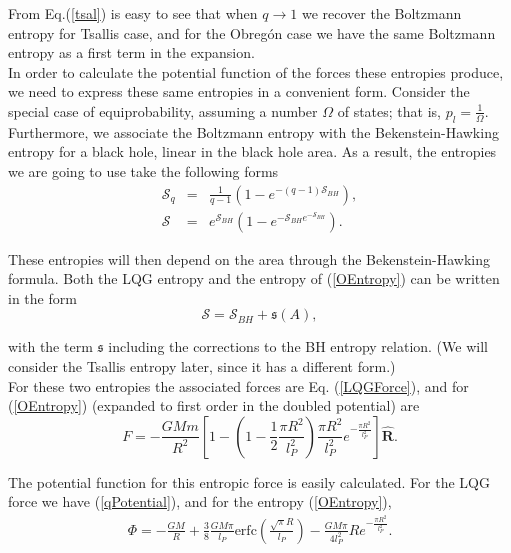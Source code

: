 \documentclass[nofootinbib,aps,prd,preprint,groupedaddress,showpacs,showkeys]{revtex4-1}
\begin{document}
\noindent From Eq.(\ref {tsal}) is easy to see that when $q \rightarrow 1$ we recover the Boltzmann entropy for Tsallis case, and for the Obreg\'on case we have the same Boltzmann entropy as a first term in the expansion.\\
\indent In order to calculate the potential function of the forces these entropies produce, we need to express these same entropies in a convenient form. Consider the special case of equiprobability, assuming a number $\Omega$ of states; that is, $p_l = \frac{1}{\Omega}$. Furthermore, we associate the Boltzmann entropy with the Bekenstein-Hawking entropy for a black hole, linear in the black hole area. As a result, the entropies we are going to use take the following forms
\begin{eqnarray}
\mathcal{S}_q &=& \frac{1}{q-1} \left(1 - e^{-(q-1) \mathcal{S}_{BH}} \right), \\
\mathcal{S} &=& e^{\mathcal{S}_{BH}} \left( 1 - e^{- \mathcal{S}_{BH} e^{-\mathcal{S}_{BH}}}\right). \label{OEntropy}
\end{eqnarray}

\noindent These entropies will then depend on the area through the Bekenstein-Hawking formula. Both the LQG entropy and the entropy of (\ref{OEntropy}) can be written in the form
\begin{equation}
\mathcal{S} = \mathcal{S}_{BH} + \mathfrak{s}(A),
\end{equation}

\noindent with the term $\mathfrak{s}$ including the corrections to the BH entropy relation. (We will consider the Tsallis entropy later, since it has a different form.)\\
\indent For these two entropies the associated forces are Eq. (\ref{LQGForce}), and for (\ref{OEntropy}) (expanded to first order in the doubled potential) are
\begin{equation}
F = - \frac{GMm}{R^2} \left[ 1 - \left( 1 - \frac{1}{2} \frac{\pi R^2}{l_P^2} \right) \frac{\pi R^2}{l_P^2} e^{-\frac{\pi R^2}{l_P^2}} \right] \hat{\mathbf{R}}.
\end{equation}

\indent The potential function for this entropic force is easily calculated. For the LQG force we have (\ref{qPotential}), and for the entropy (\ref{OEntropy}),
\begin{eqnarray}
\Phi = -\frac{GM}{R} + \frac{3}{8} \frac{GM \pi}{l_P} \mathrm{erfc} \left(\frac{\sqrt{\pi} R}{l_P} \right) - \frac{GM \pi}{4 l^2_P} R e^{-\frac{\pi R^2}{l_P^2}}. \label{OPotential}
\end{eqnarray}
\end{document}
